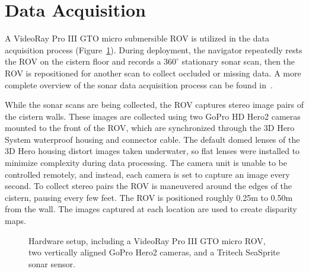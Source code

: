 \documentclass{llncs}
\begin{document}
\section{Data Acquisition}
\label{sec:data}
\noindent A VideoRay Pro III GTO micro submersible ROV is utilized in the data acquisition process (Figure~\ref{fig:ROV}). 
During deployment, the navigator repeatedly rests the ROV on the cistern floor and records a $360^{\circ}$ stationary sonar scan, then the ROV is repositioned for another scan to collect occluded or missing data. 
A more complete overview of the sonar data acquisition process can be found in~\cite{ClarkVast}. 

While the sonar scans are being collected, the ROV captures stereo image pairs of the cistern walls. These images are collected using two GoPro HD Hero2 cameras mounted to the front of the ROV, which are synchronized through the 3D Hero System waterproof housing and connector cable. The default domed lenses of the 3D Hero housing distort images taken underwater, so flat lenses were installed to minimize complexity during data processing. The camera unit is unable to be controlled remotely, and instead, each camera is set to capture an image every second. To collect stereo pairs the ROV is maneuvered around the edges of the cistern, pausing every few feet. The ROV is positioned roughly 0.25m to 0.50m from the wall. The images captured at each location are used to create disparity maps.
%
\begin{figure}[!h]
   \vspace{-0.2cm}
   \caption{Hardware setup, including a VideoRay Pro III GTO micro ROV, two vertically aligned GoPro Hero2 cameras, and a Tritech SeaSprite sonar sensor.}
  \label{fig:ROV}
 \end{figure}
 \vspace{-25pt}
\end{document}
